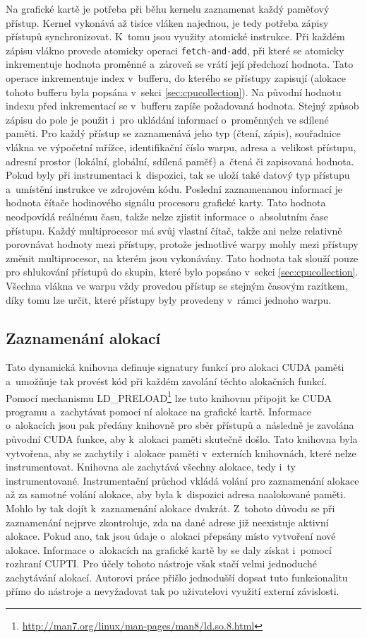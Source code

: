 Na grafické kartě je potřeba při běhu kernelu zaznamenat každý paměťový přístup. Kernel vykonává až tisíce vláken najednou, je tedy potřeba zápisy přístupů synchronizovat. K~tomu jsou využity atomické instrukce. Při každém zápisu vlákno provede atomicky operaci \texttt{fetch-and-add}, při které se atomicky inkrementuje hodnota proměnné a~zároveň se vrátí její předchozí hodnota. Tato operace inkrementuje index v~bufferu, do kterého se přístupy zapisují (alokace tohoto bufferu byla popsána v~sekci \ref{sec:cpucollection}). Na původní hodnotu indexu před inkrementací se v~bufferu zapíše požadovaná hodnota. Stejný způsob zápisu do pole je použit i~pro ukládání informací o~proměnných ve sdílené paměti. Pro každý přístup se zaznamenává jeho typ (čtení, zápis), souřadnice vlákna ve výpočetní mřížce, identifikační číslo warpu, adresa a~velikost přístupu, adresní prostor (lokální, globální, sdílená paměť) a~čtená či zapisovaná hodnota. Pokud byly při instrumentaci k~dispozici, tak se uloží také datový typ přístupu a~umístění instrukce ve zdrojovém kódu. Poslední zaznamenanou informací je hodnota čítače hodinového signálu procesoru grafické karty. Tato hodnota neodpovídá reálnému času, takže nelze zjistit informace o~absolutním čase přístupu. Každý multiprocesor má svůj vlastní čítač, takže ani nelze relativně porovnávat hodnoty mezi přístupy, protože jednotlivé warpy mohly mezi přístupy změnit multi\-procesor, na kterém jsou vykonávány. Tato hodnota tak slouží pouze pro shlukování přístupů do skupin, které bylo popsáno v~sekci \ref{sec:cpucollection}. Všechna vlákna ve warpu vždy provedou přístup se stejným časovým razítkem, díky tomu lze určit, které přístupy byly provedeny v~rámci jednoho warpu.

\subsection{Zaznamenání alokací}
\label{sec:runtimetracker}
Tato dynamická knihovna definuje signatury funkcí pro alokaci CUDA paměti a~umožňuje tak provést kód při každém zavolání těchto alokačních funkcí. Pomocí mechanismu LD\_PRELOAD\footnote{\url{http://man7.org/linux/man-pages/man8/ld.so.8.html}} lze tuto knihovnu připojit ke CUDA programu a~zachytávat pomocí ní alokace na grafické kartě. Informace o~alokacích jsou pak předány knihovně pro sběr přístupů a~následně je zavolána původní CUDA funkce, aby k~alokaci paměti skutečně došlo. Tato knihovna byla vytvořena, aby se zachytily i~alokace paměti v~externích knihovnách, které nelze instrumentovat. Knihovna ale zachytává všechny alokace, tedy i~ty instrumentované. Instrumentační průchod vkládá volání pro zaznamenání alokace až za samotné volání alokace, aby byla k~dispozici adresa naalokované paměti. Mohlo by tak dojít k~zaznamenání alokace dvakrát. Z~tohoto důvodu se při zaznamenání nejprve zkontroluje, zda na dané adrese již neexistuje aktivní alokace. Pokud ano, tak jsou údaje o~alokaci přepsány místo vytvoření nové alokace.
Informace o~alokacích na grafické kartě by se daly získat i~pomocí rozhraní CUPTI. Pro účely tohoto nástroje však stačí velmi jednoduché zachytávání alokací. Autorovi práce přišlo jednodušší dopsat tuto funkcionalitu přímo do nástroje a nevyžadovat tak po uživatelovi využití externí závislosti.

